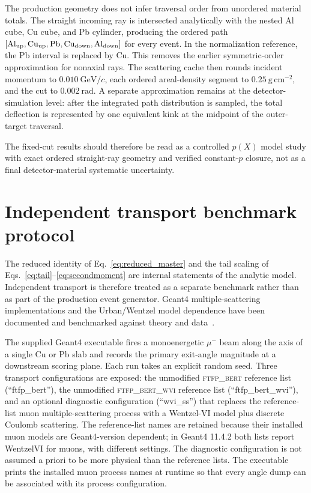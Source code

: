 \documentclass[aps,pra,reprint,longbibliography,floatfix]{revtex4-2}
\begin{document}
The production geometry does not infer traversal order from unordered material totals.  The straight incoming ray is intersected analytically with the nested Al cube, Cu cube, and Pb cylinder, producing the ordered path $[\mathrm{Al}_{\rm up},\mathrm{Cu}_{\rm up},\mathrm{Pb},\mathrm{Cu}_{\rm down},\mathrm{Al}_{\rm down}]$ for every event.  In the normalization reference, the Pb interval is replaced by Cu.  This removes the earlier symmetric-order approximation for nonaxial rays.  The scattering cache then rounds incident momentum to $0.010~\mathrm{GeV}/c$, each ordered areal-density segment to $0.25~\mathrm{g\,cm^{-2}}$, and the cut to $0.002~\mathrm{rad}$.  A separate approximation remains at the detector-simulation level: after the integrated path distribution is sampled, the total deflection is represented by one equivalent kink at the midpoint of the outer-target traversal.

The fixed-cut results should therefore be read as a controlled $p(X)$ model study with exact ordered straight-ray geometry and verified constant-$p$ closure, not as a final detector-material systematic uncertainty.

\section{Independent transport benchmark protocol}\label{app:g4}
The reduced identity of Eq.~\eqref{eq:reduced_master} and the tail scaling of Eqs.~\eqref{eq:tail}--\eqref{eq:secondmoment} are internal statements of the analytic model.  Independent transport is therefore treated as a separate benchmark rather than as part of the production event generator.  Geant4 multiple-scattering implementations and the Urban/Wentzel model dependence have been documented and benchmarked against theory and data~\cite{agostinelli2003,allison2016,ivanchenko2010,makarova2017,mice2022}.

The supplied Geant4 executable fires a monoenergetic $\mu^-$ beam along the axis of a single Cu or Pb slab and records the primary exit-angle magnitude at a downstream scoring plane.  Each run takes an explicit random seed.  Three transport configurations are exposed: the unmodified \textsc{ftfp\_bert} reference list (``ftfp\_bert''), the unmodified \textsc{ftfp\_bert\_wvi} reference list (``ftfp\_bert\_wvi''), and an optional diagnostic configuration (``wvi\_ss'') that replaces the reference-list muon multiple-scattering process with a Wentzel-VI model plus discrete Coulomb scattering.  The reference-list names are retained because their installed muon models are Geant4-version dependent; in Geant4 11.4.2 both lists report WentzelVI for muons, with different settings.  The diagnostic configuration is not assumed a priori to be more physical than the reference lists.  The executable prints the installed muon process names at runtime so that every angle dump can be associated with its process configuration.
\end{document}
